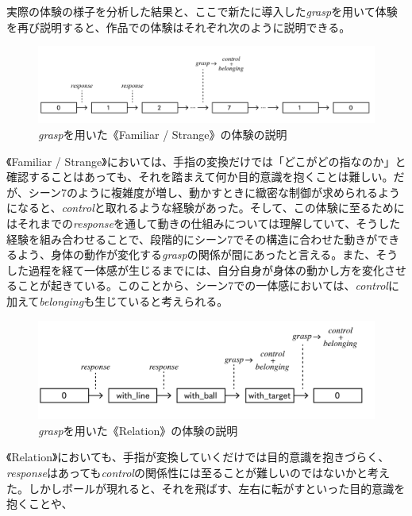 実際の体験の様子を分析した結果と、ここで新たに導入した\textit{grasp}を用いて体験を再び説明すると、作品での体験はそれぞれ次のように説明できる。

\begin{figure}[H]
  \centering
  \includegraphics[width=15cm]{img/result_fs.png}
  \caption{\textit{grasp}を用いた《Familiar / Strange》の体験の説明}
  \label{fig:result_fs}
\end{figure}

《Familiar / Strange》においては、手指の変換だけでは「どこがどの指なのか」と確認することはあっても、それを踏まえて何か目的意識を抱くことは難しい。だが、シーン7のように複雑度が増し、動かすときに緻密な制御が求められるようになると、\textit{control}と取れるような経験があった。そして、この体験に至るためにはそれまでの\textit{response}を通して動きの仕組みについては理解していて、そうした経験を組み合わせることで、段階的にシーン7でその構造に合わせた動きができるよう、身体の動作が変化する\textit{grasp}の関係が間にあったと言える。また、そうした過程を経て一体感が生じるまでには、自分自身が身体の動かし方を変化させることが起きている。このことから、シーン7での一体感においては、\textit{control}に加えて\textit{belonging}も生じていると考えられる。

\begin{figure}[H]
  \centering
  \includegraphics[width=15cm]{img/result_rl.png}
  \caption{\textit{grasp}を用いた《Relation》の体験の説明}
  \label{fig:result_rl}
\end{figure}

《Relation》においても、手指が変換していくだけでは目的意識を抱きづらく、\textit{response}はあっても\textit{control}の関係性には至ることが難しいのではないかと考えた。しかしボールが現れると、それを飛ばす、左右に転がすといった目的意識を抱くことや、

